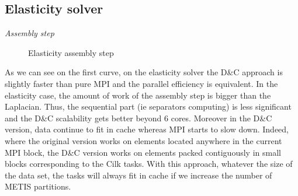 \documentclass{IOS-Book-Article}
\begin{document}
\subsection{Elasticity solver}
\emph{Assembly step}\\
\begin{figure}[htp]
 \centering
 \hspace{1em}%
 \caption{Elasticity assembly step}
\end{figure}

As we can see on the first curve, on the elasticity solver the D\&C approach is slightly faster than pure MPI and the parallel efficiency is equivalent.
In the elasticity case, the amount of work of the assembly step is bigger than the Laplacian.
Thus, the sequential part (ie separators computing) is less significant and the D\&C scalability gets better beyond 6 cores.
Moreover in the D\&C version, data continue to fit in cache whereas MPI starts to slow down. Indeed, where the original version works on elements located
anywhere in the current MPI block, the D\&C version works on elements packed contiguously in small blocks corresponding to the Cilk tasks.
With this approach, whatever the size of the data set, the tasks will always fit in cache if we increase the number of METIS partitions.\\
\end{document}

